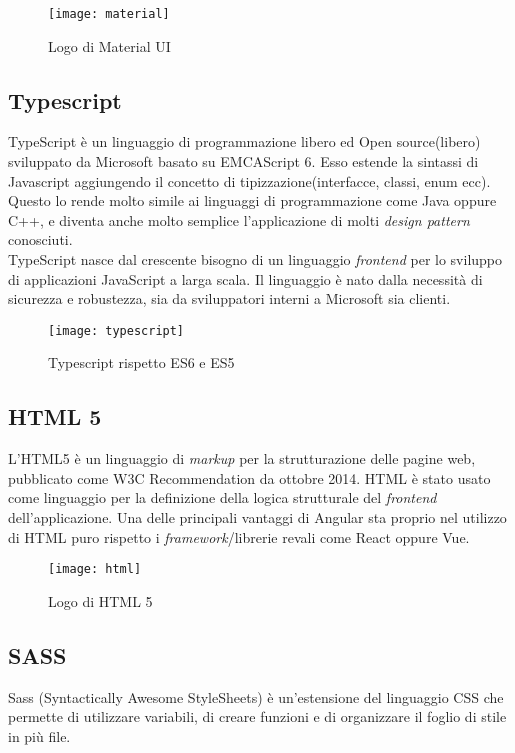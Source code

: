 \begin{figure}[!h] 
	\centering 
	\texttt{[image: material]}
	\caption{Logo di Material UI} 
\end{figure}


\subsection{Typescript} TypeScript è un linguaggio di programmazione libero ed Open source(libero) sviluppato da Microsoft basato su \gls{EMCAScript 6}. Esso estende la sintassi di \gls{Javascript} aggiungendo il concetto di tipizzazione(interfacce, classi, enum ecc). Questo lo rende molto simile ai linguaggi di programmazione come Java oppure C++, e diventa anche molto semplice l'applicazione di molti \emph{design pattern} conosciuti.
\\

 TypeScript nasce dal crescente bisogno di un linguaggio \emph{frontend} per lo sviluppo di applicazioni JavaScript a larga scala. Il linguaggio è nato dalla necessità di sicurezza e robustezza, sia da sviluppatori interni a Microsoft sia clienti. 
\begin{figure}[!h] 
	\centering 
	\texttt{[image: typescript]} 
	\caption{Typescript rispetto ES6 e ES5}
\end{figure}


\subsection{HTML 5} L'HTML5 è un linguaggio di \emph{markup} per la strutturazione delle pagine web, pubblicato come \gls{W3C Recommendation} da ottobre 2014. HTML è stato usato come linguaggio per la definizione della logica strutturale del
\emph{frontend} dell’applicazione. Una delle principali vantaggi di Angular sta proprio nel utilizzo di HTML puro rispetto i \emph{framework}/librerie revali come React oppure Vue. 
\begin{figure}[!h] 
	\centering 
	\texttt{[image: html]} 
	\caption{Logo di HTML 5}
\end{figure}

\subsection{SASS} Sass (Syntactically Awesome StyleSheets) è un'estensione del linguaggio CSS che permette di utilizzare variabili, di creare funzioni e di organizzare il foglio di stile in più file.
\\

